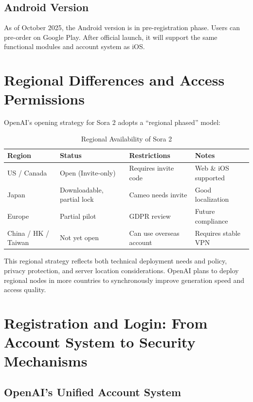 \subsection{Android Version}

As of October 2025, the Android version is in pre-registration phase. Users can pre-order on Google Play. After official launch, it will support the same functional modules and account system as iOS.

\section{Regional Differences and Access Permissions}

OpenAI's opening strategy for Sora 2 adopts a ``regional phased'' model:

\begin{table}[H]
\centering
\caption{Regional Availability of Sora 2 \\ \authorillustration}
\label{tab:regional-access}
\begin{tabular}{|l|l|l|l|}
\hline
\textbf{Region} & \textbf{Status} & \textbf{Restrictions} & \textbf{Notes} \\
\hline
US / Canada & Open (Invite-only) & Requires invite code & Web \& iOS supported \\
Japan & Downloadable, partial lock & Cameo needs invite & Good localization \\
Europe & Partial pilot & GDPR review & Future compliance \\
China / HK / Taiwan & Not yet open & Can use overseas account & Requires stable VPN \\
\hline
\end{tabular}
\end{table}

This regional strategy reflects both technical deployment needs and policy, privacy protection, and server location considerations. OpenAI plans to deploy regional nodes in more countries to synchronously improve generation speed and access quality.

\section{Registration and Login: From Account System to Security Mechanisms}

\subsection{OpenAI's Unified Account System}

